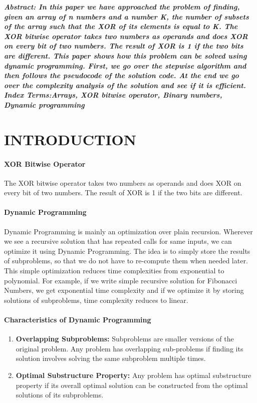 \documentclass[10pt]{article}
\begin{document}
\begin{multicols*}{2}

    \textbf{\emph{{Abstract}:  In this paper we have approached the problem of finding, given an array of n numbers and a number K, the number of subsets of the array such that the XOR of its elements is equal to K. The XOR bitwise operator takes two numbers as operands and does XOR on every bit of two numbers. The result of XOR is 1 if the two bits are different.
This paper shows how this problem can be solved using dynamic programming. First, we go over the stepwise algorithm and then follows the pseudocode of the solution code. At the end we go over the complexity analysis of the solution and see if it is efficient.
}}\\
	
	\textbf{\emph{{Index Terms}:Arrays, XOR bitwise operator, Binary numbers, Dynamic programming\\
	}}


\section*{INTRODUCTION}

\paragraph{XOR Bitwise Operator}
The XOR bitwise operator takes two numbers as operands and does XOR on every bit of two numbers. The result of XOR is 1 if the two bits are different.

\paragraph{Dynamic Programming}
Dynamic Programming is mainly an optimization over plain recursion. Wherever we see a recursive solution that has repeated calls for same inputs, we can optimize it using Dynamic Programming. The idea is to simply store the results of subproblems, so that we do not have to re-compute them when needed later. This simple optimization reduces time complexities from exponential to polynomial. For example, if we write simple recursive solution for Fibonacci Numbers, we get exponential time complexity and if we optimize it by storing solutions of subproblems, time complexity reduces to linear.\\

\paragraph{Characteristics of Dynamic Programming}
\begin{enumerate}
    \item \textbf{Overlapping Subproblems:} Subproblems are smaller versions of the original problem. Any problem has overlapping sub-problems if finding its solution involves solving the same subproblem multiple times.
    \item \textbf{Optimal Substructure Property:} Any problem has optimal substructure property if its overall optimal solution can be constructed from the optimal solutions of its subproblems. 
\end{enumerate}


\end{multicols*}
\end{document}
